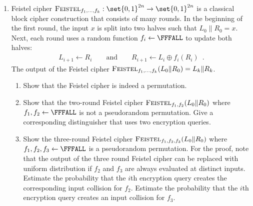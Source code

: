\documentclass{article}
\begin{document}
\begin{enumerate}
\item Feistel cipher
  $\textsc{Feistel}_{f_1,\ldots,f_k}:\set{0,1}^{2n}\to\set{0,1}^{2n}$
  is a classical block cipher construction that consists of many
  rounds.  In the beginning of the first round, the input $x$ is split
  into two halves such that $L_0\|R_0=x$. Next, each round uses a
  random function $f_i\gets\FFFALL$ to update both halves:
  \begin{align*}
    L_{i+1}\gets R_i\qquad\text{and}\qquad R_{i+1}\gets L_i\oplus f_i(R_i)\enspace.
  \end{align*}
  The output of the Feistel cipher $
  \textsc{Feistel}_{f_1,\ldots,f_k}(L_0\|R_0)= L_k\|R_k$.
  \begin{enumerate}
  \item Show that the Feistel cipher is indeed a permutation.
  \item Show that the two-round Feistel cipher
    $\textsc{Feistel}_{f_1,f_2}(L_0\|R_0)$ where $f_1,f_2\gets\FFFALL$
    is not a pseudorandom permutation. Give a corresponding
    distinguisher that uses two encryption queries.
  \item Show the three-round Feistel cipher
    $\textsc{Feistel}_{f_1,f_2,f_3}(L_0\|R_0)$ where
    $f_1,f_2,f_3\gets\FFFALL$ is a pseudorandom permutation. For the
    proof, note that the output of the three round Feistel cipher can
    be replaced with uniform distribution if $f_2$ and $f_3$ are
    always evaluated at distinct inputs. Estimate the probability that
    the $i$th encryption query creates the corresponding input
    collision for $f_2$.  Estimate the probability that the $i$th
    encryption query creates an input collision for $f_3$.
 

\end{enumerate}
\end{enumerate}
\end{document}

